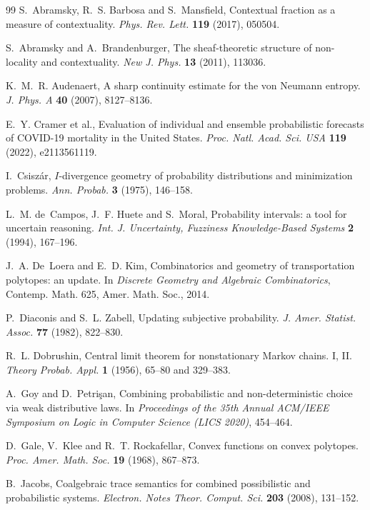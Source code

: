 \documentclass[11pt]{article}
\theoremstyle{definition}
\theoremstyle{remark}
\begin{document}
\begin{thebibliography}{99}
S.~Abramsky, R.~S. Barbosa and S.~Mansfield, Contextual fraction as a measure of contextuality. \emph{Phys. Rev. Lett.}
\textbf{119} (2017), 050504.

S.~Abramsky and A.~Brandenburger, The sheaf-theoretic structure of non-locality and contextuality. \emph{New J. Phys.} \textbf{13}
(2011), 113036.

K.~M.~R. Audenaert, A sharp continuity estimate for the von {N}eumann entropy. \emph{J. Phys. A} \textbf{40} (2007), 8127--8136.

E.~Y. Cramer et al., Evaluation of individual and ensemble probabilistic forecasts of {COVID}-19 mortality in the {U}nited
{S}tates. \emph{Proc. Natl. Acad. Sci. USA} \textbf{119} (2022), e2113561119.

I.~Csiszár, {$I$}-divergence geometry of probability distributions and minimization problems. \emph{Ann. Probab.} \textbf{3}
(1975), 146--158.

L.~M. de~Campos, J.~F. Huete and S.~Moral, Probability intervals: a tool for uncertain reasoning. \emph{Int. J. Uncertainty,
Fuzziness Knowledge-Based Systems} \textbf{2} (1994), 167--196.

J.~A. De~Loera and E.~D. Kim, Combinatorics and geometry of transportation polytopes: an update. In \emph{Discrete Geometry and
Algebraic Combinatorics}, Contemp. Math. 625, Amer. Math. Soc., 2014.

P.~Diaconis and S.~L. Zabell, Updating subjective probability. \emph{J. Amer. Statist. Assoc.} \textbf{77} (1982), 822--830.

R.~L. Dobrushin, Central limit theorem for nonstationary {M}arkov chains. {I}, {II}. \emph{Theory Probab. Appl.} \textbf{1} (1956),
65--80 and 329--383.

A.~Goy and D.~Petri\c{s}an, Combining probabilistic and non-deterministic choice via weak distributive laws. In \emph{Proceedings of
the 35th Annual ACM/IEEE Symposium on Logic in Computer Science (LICS 2020)}, 454--464.

D.~Gale, V.~Klee and R.~T. Rockafellar, Convex functions on convex polytopes. \emph{Proc. Amer. Math. Soc.} \textbf{19} (1968), 867--873.

B.~Jacobs, Coalgebraic trace semantics for combined possibilistic and probabilistic systems. \emph{Electron. Notes Theor. Comput. Sci.}
\textbf{203} (2008), 131--152.


\end{thebibliography}
\end{document}
